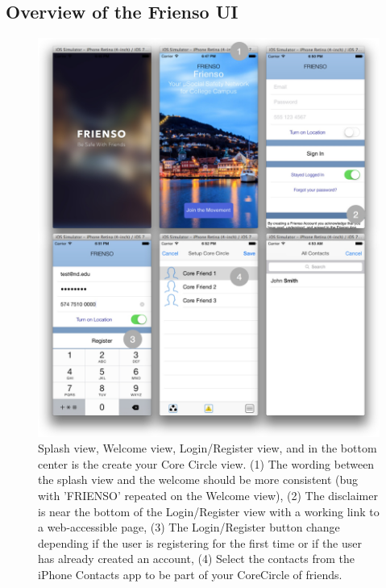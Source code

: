 \subsection{Overview of the Frienso UI}
\begin{figure}[ht!]
 \centering
  \includegraphics[width=\textwidth]{images/mvp_actual0.jpg}
	\caption{
	Splash view, Welcome view, Login/Register view, and in the bottom center is the 
	create your Core Circle view.  (1) The wording between the splash view and the 
	welcome should be more consistent (bug with 'FRIENSO' repeated on the Welcome view), 
	(2) The disclaimer is near the bottom of the Login/Register view with a working link 
	to a web-accessible page, (3) The Login/Register button change depending if the 
	user is registering for the first time or if the user has already created an account, 
	(4) Select the contacts from the iPhone Contacts app to be part of your CoreCircle 
	of friends.
	}
	\end{figure}

